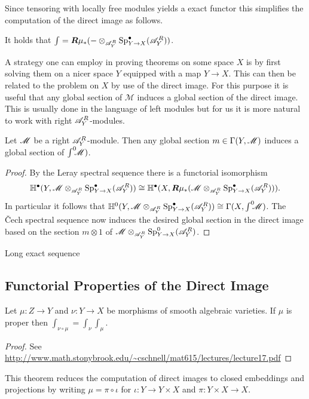     Since tensoring with locally free modules yields a exact functor this simplifies the computation of the direct image as follows.
    \begin{corollary}
        It holds that $\int = \boldsymbol{R}\mu_* ({-}\otimes_{\mathscr{A}_Y^R} \operatorname{Sp}_{Y\to X}^\bullet(\mathscr{A}_Y^R))$.
    \end{corollary}
    A strategy one can employ in proving theorems on some space $X$ is by first solving them on a nicer space $Y$ equipped with a map $Y\to X$. This can then be related to the problem on $X$ by use of the direct image. For this purpose it is useful that any global section of $\mathcal{M}$ induces a global section of the direct image. This is usually done in the language of left modules but for us it is more natural to work with right $\mathscr{A}_Y^R$-modules.
    \begin{lemma}\label{lem: GlobalSectionDirectImage}
        Let $\mathscr{M}$ be a right $\mathscr{A}_Y^R$-module. Then any global section $m\in\Gamma(Y,\mathscr{M})$ induces a global section of $\int^0 \mkern -8mu\mathscr{M})$.
    \end{lemma}
    \begin{proof}
      By the Leray spectral sequence there is a functorial isomorphism
      $$\mathbb{H}^\bullet(Y,\mathscr{M}\otimes_{\mathscr{A}_Y^R} \operatorname{Sp}_{Y\to X}^\bullet(\mathscr{A}_Y^R)) \cong \mathbb{H}^\bullet(X,\boldsymbol{R}\mu_*(\mathscr{M}\otimes_{\mathscr{A}_Y^R} \operatorname{Sp}_{Y\to X}^\bullet(\mathscr{A}_Y^R))).$$
      In particular it follows that $\mathbb{H}^0(Y,\mathscr{M} \otimes_{\mathscr{A}_Y^R} \operatorname{Sp}_{Y\to X}^\bullet(\mathscr{A}_Y^R)) \cong \Gamma(X,\int^0 \mkern -8mu\mathscr{M})$. The \v Cech spectral sequence now induces the desired global section in the direct image based on the section $m\otimes 1$ of $\mathscr{M} \otimes_{\mathscr{A}_Y^R}\operatorname{Sp}_{Y\to X}^0(\mathscr{A}_Y^R)$.
    \end{proof}
    \begin{theorem}
      Long exact sequence
    \end{theorem}
    \subsection{Functorial Properties of the Direct Image}
    \begin{theorem}
       Let $\mu:Z\to Y$ and $\nu:Y\to X$ be morphisms of smooth algebraic varieties. If $\mu$ is proper then $\int_{\nu\circ \mu} = \int_\nu \int_\mu$.
    \end{theorem}
    \begin{proof}
      See \url{http://www.math.stonybrook.edu/~cschnell/mat615/lectures/lecture17.pdf}
    \end{proof}
    This theorem reduces the computation of direct images to closed embeddings and projections by writing $\mu = \pi \circ \iota$ for $\iota:Y\to Y\times X$ and $\pi:Y\times X\to X$.



